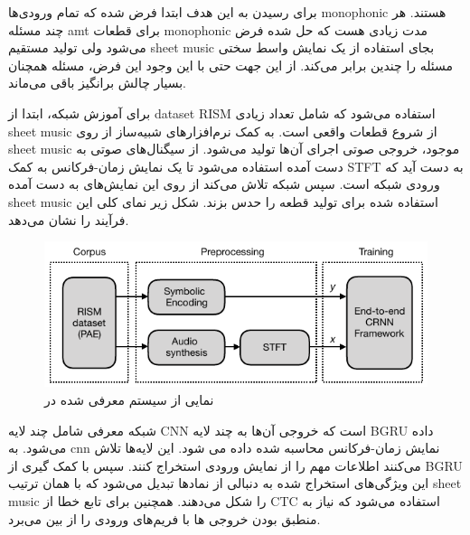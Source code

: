 برای رسیدن به این هدف ابتدا فرض شده که تمام ورودی‌ها \gls{monophonic} هستند. هر
چند مسئله \gls{amt} برای قطعات \gls{monophonic} مدت زیادی هست که حل شده فرض
می‌شود ولی تولید مستقیم \gls{sheet music} بجای استفاده از یک نمایش واسط سختی
مسئله را چندین برابر می‌کند. از این جهت حتی با این وجود این فرض، مسئله همچنان
بسیار چالش برانگیز باقی می‌ماند.

برای آموزش شبکه، ابتدا از \gls{dataset} RISM استفاده می‌شود که شامل تعداد زیادی
\gls{sheet music} از شروع قطعات واقعی است. به کمک نرم‌افزارهای شبیه‌ساز از روی
\gls{sheet music} موجود، خروجی صوتی اجرای آن‌ها تولید می‌شود. از سیگنال‌های صوتی
به دست آمده استفاده می‌شود تا یک نمایش زمان-فرکانس به کمک \gls{STFT} به دست آید
که ورودی شبکه است. سپس شبکه تلاش می‌کند از روی این نمایش‌های به دست آمده
\gls{sheet music} استفاده شده برای تولید قطعه را حدس بزند. شکل زیر نمای کلی این
فرآیند را نشان می‌دهد.
\begin{figure}[ht]
    \centering
    \includegraphics[width=12cm]{./statics/roman2018end_architecture.png}
    \caption{نمایی از سیستم معرفی شده در \cite{roman2018end}}
\end{figure}

شبکه معرفی شامل چند لایه \gls{CNN} است که خروجی آن‌ها به چند لایه \gls{BGRU}
داده می‌شود. به \gls{cnn} نمایش زمان-فرکانس محاسبه شده داده می شود. این لایه‌ها
تلاش می‌کنند اطلاعات مهم را از نمایش ورودی استخراج کنند. سپس با کمک گیری از
\gls{BGRU} این ویژگی‌های استخراج شده به دنبالی از نمادها تبدیل می‌شود که با همان
ترتیب \gls{sheet music} را شکل می‌دهند. همچنین برای تابع خطا از \gls{CTC}
استفاده می‌شود که نیاز به منطبق بودن خروجی ها با فریم‌های ورودی را از بین می‌برد.

